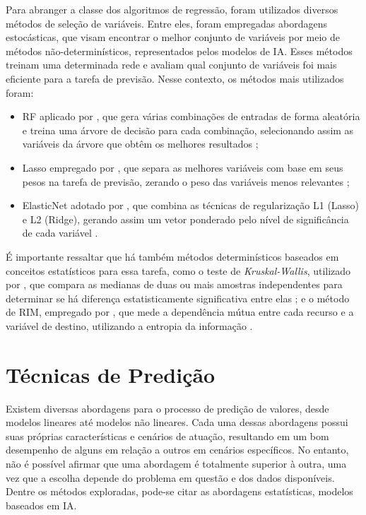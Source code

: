Para abranger a classe dos algoritmos de regressão, foram utilizados diversos métodos de seleção de variáveis. Entre eles, foram empregadas abordagens estocásticas, que visam encontrar o melhor conjunto de variáveis por meio de métodos não-determinísticos, representados pelos modelos de IA. Esses métodos treinam uma determinada rede e avaliam qual conjunto de variáveis foi mais eficiente para a tarefa de previsão. Nesse contexto, os métodos mais utilizados foram: 
\begin{itemize}
    \item \ac{RF} aplicado por , que gera várias combinações de entradas de forma aleatória e treina uma árvore de decisão para cada combinação, selecionando assim as variáveis da árvore que obtêm os melhores resultados \cite{breiman2001random}; 
    \item Lasso empregado por , que separa as melhores variáveis com base em seus pesos na tarefa de previsão, zerando o peso das variáveis menos relevantes \cite{muthukrishnan2016lasso}; 
    \item ElasticNet adotado por , que combina as técnicas de regularização L1 (Lasso) e L2 (Ridge), gerando assim um vetor ponderado pelo nível de significância de cada variável \cite{amini2021two}.
\end{itemize}
É importante ressaltar que há também métodos determinísticos baseados em conceitos estatísticos para essa tarefa, como o teste de \textit{Kruskal-Wallis}, utilizado por , que compara as medianas de duas ou mais amostras independentes para determinar se há diferença estatisticamente significativa entre elas \cite{kruskal1952use}; e o método de \ac{RIM}, empregado por , que mede a dependência mútua entre cada recurso e a variável de destino, utilizando a entropia da informação \cite{kraskov2004estimating}.

\section{Técnicas de Predição}
\label{subsec:tecnicas_predicao}
Existem diversas abordagens para o processo de predição de valores, desde modelos lineares até modelos não lineares. Cada uma dessas abordagens possui suas próprias características e cenários de atuação, resultando em um bom desempenho de alguns em relação a outros em cenários específicos. No entanto, não é possível afirmar que uma abordagem é totalmente superior à outra, uma vez que a escolha depende do problema em questão e dos dados disponíveis. Dentre os métodos exploradas, pode-se citar as abordagens estatísticas, modelos baseados em \ac{IA}.

